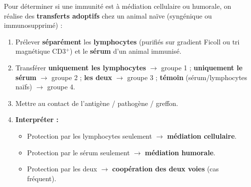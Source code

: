 \documentclass[11pt]{article}
\begin{document}
\begin{methode}
Pour déterminer si une immunité est à médiation cellulaire ou humorale, on réalise des \textbf{transferts adoptifs} chez un animal naïve (syngénique ou immunosupprimé) :
\begin{enumerate}
    \item Prélever \textbf{séparément} les \textbf{lymphocytes} (purifiés sur gradient Ficoll ou tri magnétique CD3$^+$) et le \textbf{sérum} d'un animal immunisé.
    \item Transférer \textbf{uniquement les lymphocytes} $\to$ groupe 1 ; \textbf{uniquement le sérum} $\to$ groupe 2 ; \textbf{les deux} $\to$ groupe 3 ; \textbf{témoin} (sérum/lymphocytes naïfs) $\to$ groupe 4.
    \item Mettre au contact de l'antigène / pathogène / greffon.
    \item \textbf{Interpréter :}
    \begin{itemize}
        \item Protection par les lymphocytes seulement $\to$ \textbf{médiation cellulaire}.
        \item Protection par le sérum seulement $\to$ \textbf{médiation humorale}.
        \item Protection par les deux $\to$ \textbf{coopération des deux voies} (cas fréquent).
    \end{itemize}
\end{enumerate}
\end{methode}
\end{document}
